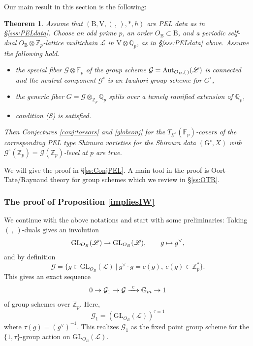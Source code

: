 \documentclass[reqno, 10pt]{amsart}
\makeatletter
\newcommand{\BF}{\ensuremath{\mathbb {F}}\xspace}
\newcommand{\BG}{\ensuremath{\mathbb {G}}\xspace}
\newcommand{\BQ}{\ensuremath{\mathbb {Q}}\xspace}
\newcommand{\BZ}{\ensuremath{\mathbb {Z}}\xspace}
\newcommand{\CG}{\ensuremath{\mathcal {G}}\xspace}
\newcommand{\RB}{\ensuremath{\mathrm {B}}\xspace}
\newcommand{\RG}{\ensuremath{\mathrm {G}}\xspace}
\newcommand{\RV}{\ensuremath{\mathrm {V}}\xspace}
\newcommand{\GL}{\mathrm{GL}}
\newtheorem{theorem}[subsubsection]{Theorem}
\theoremstyle{definition}
\numberwithin{equation}{subsection}
\numberwithin{subsubsection}{subsection}
\renewcommand{\to}{%
   \ifbool{@display}{\longrightarrow}{\rightarrow}%
   }
\let\shortmapsto\mapsto
\renewcommand{\mapsto}{%
   \ifbool{@display}{\shortmapsto}{\shortmapsto}%
   }
\makeatother
\begin{document}
Our main result in this section is the following:



 
 \begin{theorem}\label{thm:PEL}
 Assume that $(\RB,\RV,( \,,\,), *, h)$ are PEL data as in \S \ref{sss:PELdata}.  Choose an odd prime $p$, an order $O_\RB\subset \RB$, and a periodic self-dual $O_\RB\otimes {\BZ_p}$-lattice multichain $\mathscr L$ in $\RV\otimes\BQ_p$,  as in \S \ref{sss:PELdata} above. Assume the following hold.
 \begin{itemize}
 \item[1)]  
 the special fiber $\CG\otimes\BF_p$ of
 the group scheme $\CG={\rm Aut}_{O_B,(\, )}(\mathscr L)$   is connected
and the neutral component $\CG^\circ$ is an Iwahori group scheme for $G^\circ$,
 
 \item[2)]  the generic fiber $G=\CG\otimes_{\BZ_p}\BQ_p$ splits over a tamely ramified extension of $\BQ_p$,  
 
 \item[3)]   condition (S) is satisfied. 
 \end{itemize}
 
 
 Then Conjectures \ref{conj:torsors} and \ref{globconj}  for the 
 $T_{\CG^\circ}(\BF_p)$-covers of the corresponding PEL type Shimura varieties for the Shimura data $(\RG^\circ, X)$ with $\CG^\circ(\BZ_p)=\CG(\BZ_p)$-level at $p$ are true.
 \end{theorem}
 
 
 

We will give the proof in \S \ref{ss:ConjPEL}. A main tool in the proof is Oort--Tate/Raynaud theory for group schemes which we review in \S \ref{ss:OTR}. 

 


 
\subsubsection{The proof of Proposition \ref{impliesIW}}\label{sss:proofImpliesIW}
 We continue with the above notations and start with some preliminaries:
Taking $(\ ,\ )$-duals gives an involution 
\[
\GL_{O_B}(\mathscr L)\to \GL_{O_B}(\mathscr L),\qquad g\mapsto g^\vee,
\]
and by definition
\[
\CG=\{g\in \GL_{O_B}(\mathscr L)\ |\ g^\vee\cdot g=c(g), \ c(g)\in \BZ_p^*\}.
\]
This gives an exact sequence
\[
0\to \CG_1\to \CG\xrightarrow{\ c\ } \BG_m\to 1
\]
of group schemes over $\BZ_p$. Here,
\begin{equation}\label{FixedPoints}
\CG_1=( \GL_{O_B}(\mathscr L))^{\tau=1}
\end{equation}
where $\tau(g)=(g^\vee)^{-1}$. This realizes $\CG_1$ as the fixed point group scheme for the $\{1, \tau\}$-group action
on $\GL_{O_B}(\mathscr L)$. 
\end{document}
